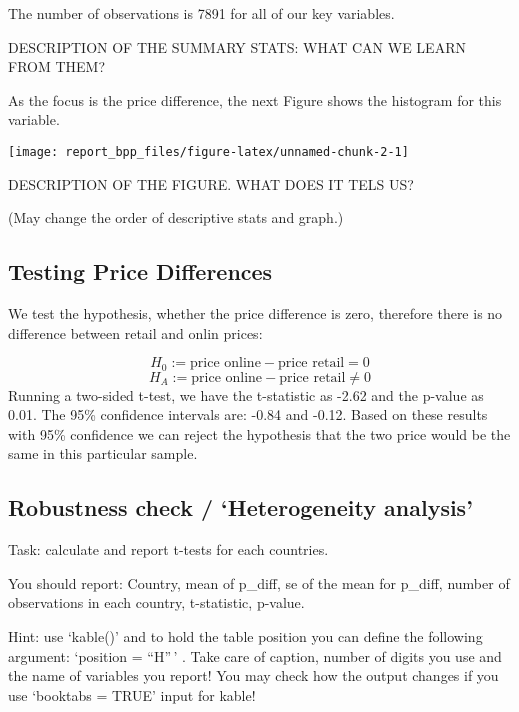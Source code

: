 \documentclass[
]{article}
\begin{document}
The number of observations is 7891 for all of our key variables.

DESCRIPTION OF THE SUMMARY STATS: WHAT CAN WE LEARN FROM THEM?

As the focus is the price difference, the next Figure shows the
histogram for this variable.

\begin{center}\texttt{[image: report\_bpp\_files/figure-latex/unnamed-chunk-2-1]} \end{center}

DESCRIPTION OF THE FIGURE. WHAT DOES IT TELS US?

(May change the order of descriptive stats and graph.)

\hypertarget{testing-price-differences}{%
\subsection{Testing Price Differences}\label{testing-price-differences}}

We test the hypothesis, whether the price difference is zero, therefore
there is no difference between retail and onlin prices:

\[H_0:=\text{price online} - \text{price retail} = 0\]
\[H_A:=\text{price online} - \text{price retail} \neq 0\] Running a
two-sided t-test, we have the t-statistic as -2.62 and the p-value as
0.01. The 95\% confidence intervals are: -0.84 and -0.12. Based on these
results with 95\% confidence we can reject the hypothesis that the two
price would be the same in this particular sample.

\hypertarget{robustness-check-heterogeneity-analysis}{%
\subsection{Robustness check / `Heterogeneity
analysis'}\label{robustness-check-heterogeneity-analysis}}

Task: calculate and report t-tests for each countries.

You should report: Country, mean of p\_diff, se of the mean for p\_diff,
number of observations in each country, t-statistic, p-value.

Hint: use `kable()' and to hold the table position you can define the
following argument: `position = ``H''\,' . Take care of caption, number
of digits you use and the name of variables you report! You may check
how the output changes if you use `booktabs = TRUE' input for kable!
\end{document}
